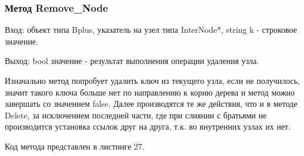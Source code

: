 \documentclass[11pt,a4paper,final]{article} %
\begin{document}
\subsubsection{Метод Remove\_Node}
Вход: объект типа Bplus, указатель на узел типа InterNode*, string k - строковое значение. \par
Выход: bool значение - результат выполнения операции удаления узла. \par
Изначально метод попробует удалить ключ из текущего узла, если не получилось, значит такого ключа больше нет по направлению к корню дерева и метод можно завершать со значением false. Далее производятся те же действия, что и в методе Delete, за исключением последней части, где при слиянии с братьями не производится установка ссылок друг на друга, т.к. во внутренних узлах их нет. \par
Код метода представлен в листинге 27.
\end{document}
